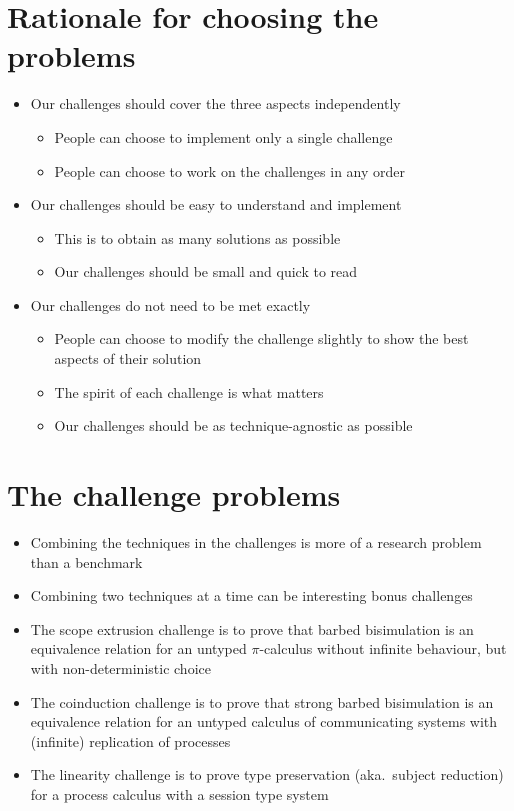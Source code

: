 \documentclass{article}
\begin{document}
\section{Rationale for choosing the problems}
\begin{itemize}
\item Our challenges should cover the three aspects independently
  \begin{itemize}
  \item People can choose to implement only a single challenge
  \item People can choose to work on the challenges in any order
  \end{itemize}
\item Our challenges should be easy to understand and implement
  \begin{itemize}
  \item This is to obtain as many solutions as possible
  \item Our challenges should be small and quick to read
  \end{itemize}
\item Our challenges do not need to be met exactly
  \begin{itemize}
  \item People can choose to modify the challenge slightly to show the best aspects of their solution
  \item The spirit of each challenge is what matters
  \item Our challenges should be as technique-agnostic as possible
  \end{itemize}
\end{itemize}

\section{The challenge problems}
\begin{itemize}
\item Combining the techniques in the challenges is more of a research problem than a benchmark
\item Combining two techniques at a time can be interesting bonus challenges
\item The scope extrusion challenge is to prove that barbed bisimulation is an equivalence relation for an untyped \(\pi\)-calculus without infinite behaviour, but with non-deterministic choice
\item The coinduction challenge is to prove that strong barbed bisimulation is an equivalence relation for an untyped calculus of communicating systems with (infinite) replication of processes
\item The linearity challenge is to prove type preservation (aka.\ subject reduction) for a process calculus with a session type system
\end{itemize}
\end{document}
